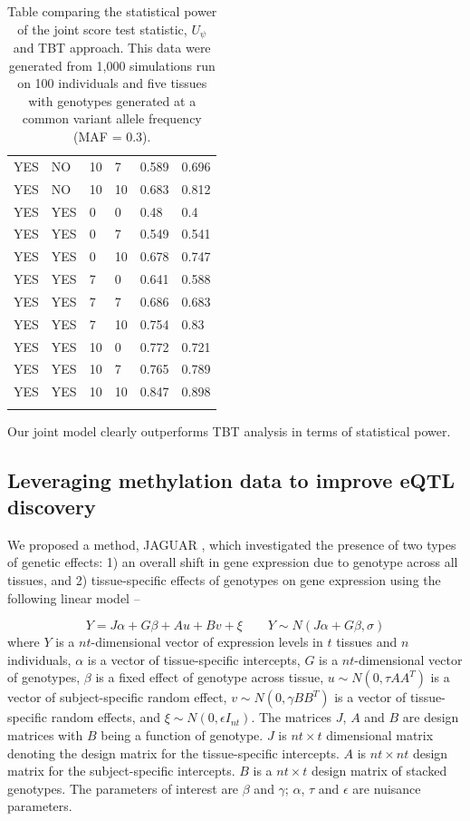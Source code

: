\documentclass[hidelinks]{article}
\begin{document}
\begin{longtable}{llllll}
YES & NO & 10 & 7 & 0.589 & 0.696 \\
YES & NO & 10 & 10 & 0.683 & 0.812 \\ \hdashline
YES & YES & 0 & 0 & 0.48 & 0.4 \\
YES & YES & 0 & 7 & 0.549 & 0.541 \\
YES & YES & 0 & 10 & 0.678 & 0.747 \\
YES & YES & 7 & 0 & 0.641 & 0.588 \\
YES & YES & 7 & 7 & 0.686 & 0.683 \\
YES & YES & 7 & 10 & 0.754 & 0.83 \\
YES & YES & 10 & 0 & 0.772 & 0.721 \\
YES & YES & 10 & 7 & 0.765 & 0.789 \\
YES & YES & 10 & 10 & 0.847 & 0.898 \\
\hline \hline
\caption{Table comparing the statistical power of the joint score test statistic, $U_\psi$ and TBT approach. This data were generated from 1,000 simulations run on 100 individuals and five tissues with genotypes generated at a common variant allele frequency (MAF = 0.3).}
\end{longtable}

Our joint model clearly outperforms TBT analysis in terms of statistical power.

\subsection{Leveraging methylation data to improve eQTL discovery}

We proposed a method, JAGUAR \cite{jaguar}, which investigated the presence of two types of genetic effects: 1) an overall shift in gene expression due to genotype across all tissues, and 2) tissue-specific effects of genotypes on gene expression using the following linear model --

\begin{equation}
Y = J\alpha + G\beta + Au + Bv + \xi \qquad Y \sim N\left(J\alpha + G\beta, \sigma\right)
\end{equation}
where $Y$ is a $nt$-dimensional vector of expression levels in $t$ tissues and $n$ individuals, $\alpha$ is a vector of tissue-specific intercepts, $G$ is a $nt$-dimensional vector of genotypes, $\beta$ is a fixed effect of genotype across tissue, $u \sim N\left(0, \tau AA^T \right)$ is a vector of subject-specific random effect, $v \sim N\left(0,\gamma BB^T \right)$ is a vector of tissue-specific random effects, and $\xi \sim N\left(0, \epsilon I_{nt} \right)$. The matrices $J$, $A$ and $B$ are design matrices with $B$ being a function of genotype. $J$ is $nt \times t$ dimensional matrix denoting the design matrix for the tissue-specific intercepts. $A$ is $nt \times nt$ design matrix for the subject-specific intercepts. $B$ is a $nt \times t$ design matrix of stacked genotypes. The parameters of interest are $\beta$ and $\gamma$; $\alpha$, $\tau$ and $\epsilon$ are nuisance parameters.
\end{document}
